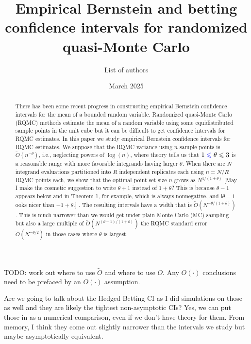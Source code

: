 \documentclass{article}
\title{Empirical Bernstein and betting confidence intervals for randomized quasi-Monte Carlo}
\date{March 2025}
\author{List of authors}
\newcommand{\art}[1]{\begingroup\color{blue}#1\endgroup}
\newcommand{\aadit}[1]{\begingroup\color{orange}#1\endgroup}
\newcommand{\fred}[1]{\begingroup\color{red}#1\endgroup}
\renewcommand{\le}{\leqslant}
\begin{document}
\maketitle
\begin{abstract}
There has been some recent progress in constructing empirical Bernstein
confidence intervals for the mean of a bounded random variable.
Randomized quasi-Monte Carlo (RQMC) methods estimate the mean of a random
variable using some equidistributed sample points in the unit cube
but it can be difficult to get confidence intervals for RQMC
estimates.  In this paper we study empirical Bernstein confidence
intervals for RQMC estimates.  We suppose that
the RQMC variance using $n$ sample points 
is $\tilde O(n^{-\theta})$\fred{, i.e., neglecting powers of $\log (n)$,} where
theory tells us that $1\art{\le}\theta\le3$ 
is a reasonable
range with more favorable integrands having larger
$\theta$. When there are $N$ integrand evaluations
partitioned into $R$ independent replicates each using $n=N/R$
RQMC points each, we show that the optimal point set size $n$ grows
as $N^{1/(1+\theta)}$ \fred{[May I make the cosmetic suggestion to write $\theta +1$ instead of $1 + \theta$?  This is because $\theta - 1$ appears below and in Theorem 1, for example, which is always nonnegative, and l$\theta - 1$ ooks  nicer than $-1+\theta$.] }. The resulting intervals have
a width that is $\tilde O(N^{-\theta/(1+\theta)})$. 
This is  much narrower
than we would get under plain Monte Carlo (MC) sampling
but also a large multiple of \fred{$\tilde O(N^{(\theta - 1)/(1+\theta)})$ }the RQMC standard error $\tilde O(N^{-\theta/2})$ in those cases where $\theta$ is largest.
\end{abstract}

\art{TODO: work out where to use $\tilde O$ and where
to use $O$. Any $O(\cdot)$ conclusions need to be 
prefaced by an $O(\cdot)$ assumption.}

\aadit{Are we going to talk about the Hedged Betting CI as I did simulations on those as well and they are likely the tightest non-asymptotic CIs?}
\art{Yes, we can put those in as a numerical comparison, even if we don't have theory for them.  From memory, I think they come out slightly narrower
than the intervals we study but maybe asymptotically equivalent.}
\end{document}
